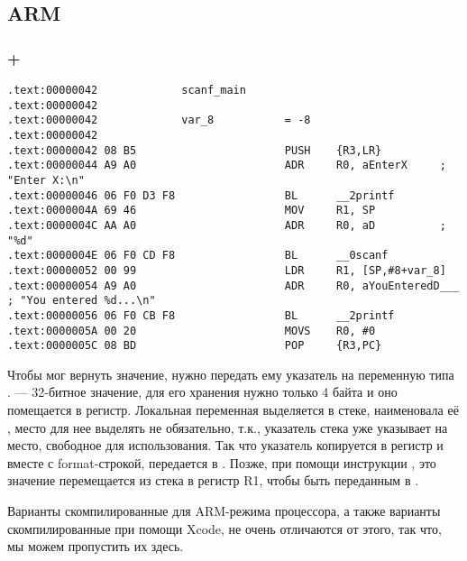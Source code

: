 ﻿\subsection{ARM}

\subsubsection{\OptimizingKeil + \ThumbMode}

\begin{lstlisting}
.text:00000042             scanf_main
.text:00000042
.text:00000042             var_8           = -8
.text:00000042
.text:00000042 08 B5                       PUSH    {R3,LR}
.text:00000044 A9 A0                       ADR     R0, aEnterX     ; "Enter X:\n"
.text:00000046 06 F0 D3 F8                 BL      __2printf
.text:0000004A 69 46                       MOV     R1, SP
.text:0000004C AA A0                       ADR     R0, aD          ; "%d"
.text:0000004E 06 F0 CD F8                 BL      __0scanf
.text:00000052 00 99                       LDR     R1, [SP,#8+var_8]
.text:00000054 A9 A0                       ADR     R0, aYouEnteredD___ ; "You entered %d...\n"
.text:00000056 06 F0 CB F8                 BL      __2printf
.text:0000005A 00 20                       MOVS    R0, #0
.text:0000005C 08 BD                       POP     {R3,PC}
\end{lstlisting}

Чтобы \scanf мог вернуть значение, нужно передать ему указатель на переменную типа \Tint. \Tint --- 32-битное 
значение, для его хранения нужно только 4 байта и оно помещается в регистр.
Локальная переменная  выделяется в стеке, \IDA наименовала её , место для нее выделять
не обязательно, т.к., указатель стека \SP уже указывает на место, свободное для использования.
Так что указатель \SP копируется в регистр  и вместе с format-строкой, передается в \scanf.
Позже, при помощи инструкции , это значение перемещается из стека в регистр R1, чтобы быть переданным
в \printf.

Варианты скомпилированные для ARM-режима процессора, а также варианты скомпилированные при помощи Xcode,
не очень отличаются от этого, так что, мы можем пропустить их здесь.

